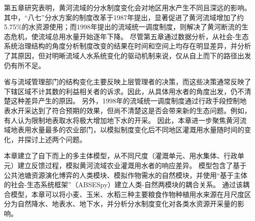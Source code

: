 第五章研究表明，黄河流域的分水制度变化会对地区用水产生不同且深远的影响。
其中，“八七”分水方案的制度改革于1987年提出，显著促进了黄河流域增加了约5.75\%的水资源使用；而1998年提出的流域统一调度制度，则解决了黄河断流的生态危机，使流域总用水量开始逐年下降。
尽管第五章通过数据分析，从社会-生态系统治理结构的角度分析制度改变的结果在时间和空间上均存在明显差异，并分析了其原因，但对明晰流域人水系统变化的驱动机制来说，仅从自上而下的路径出发仍有所不足。

省与流域管理部门的结构变化主要反映上层管理者的决策，而这些决策通常反映了下辖区域不计其数的利益相关者的诉求。因此，从具体用水者的角度出发，仍不清楚这种差异产生的原因。
另外，1998年的流域统一调度制度通过行政手段控制地表水开采达到了符合预期的效果，但尚不清楚这是否会带来新的生态问题。例如，有人认为限制地表取水将极大增加地下水的开采。
因此，本章进一步聚焦黄河流域地表用水量最多的农业部门，以模拟制度变化后不同地区灌溉用水量随时间的变化，并探讨上述两个问题。

本章建立了自下而上的多主体模型，从不同尺度（灌溉单元、用水集体、行政单元）建立反馈过程，模拟黄河流域农业灌溉用水者的响应差异。
模型包含了基于公共池塘资源演化博弈的人类模块、模拟作物需水的自然模块，并使用“基于主体的社会-生态系统框架”（ABSESpy）建立人类-自然两模块的耦合关系。
通过该耦合模型，本章可以将小麦、玉米、水稻三种主要粮食作物种植用水来源在月尺度区分为自然降水、地表水、地下水，并分析分水制度变化对各类水资源开采量的影响。
